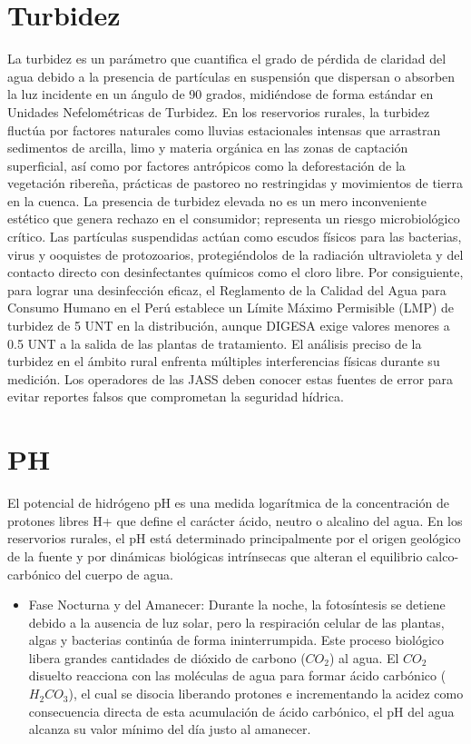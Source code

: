 \section{Turbidez}
La turbidez es un parámetro  que cuantifica el grado de pérdida de claridad del agua debido a la presencia de partículas en suspensión que dispersan o absorben la luz incidente en un ángulo de 90 grados, midiéndose de forma estándar en Unidades Nefelométricas de Turbidez. En los reservorios rurales, la turbidez fluctúa por factores naturales como lluvias estacionales intensas que arrastran sedimentos de arcilla, limo y materia orgánica en las zonas de captación superficial, así como por factores antrópicos como la deforestación de la vegetación ribereña, prácticas de pastoreo no restringidas y movimientos de tierra en la cuenca.
La presencia de turbidez elevada no es un mero inconveniente estético que genera rechazo en el consumidor; representa un riesgo microbiológico crítico. Las partículas suspendidas actúan como escudos físicos para las bacterias, virus y ooquistes de protozoarios, protegiéndolos de la radiación ultravioleta y del contacto directo con desinfectantes químicos como el cloro libre. Por consiguiente, para lograr una desinfección eficaz, el Reglamento de la Calidad del Agua para Consumo Humano en el Perú establece un Límite Máximo Permisible (LMP) de turbidez de 5 UNT en la distribución, aunque DIGESA exige valores menores a 0.5 UNT a la salida de las plantas de tratamiento.
El análisis preciso de la turbidez en el ámbito rural enfrenta múltiples interferencias físicas durante su medición. Los operadores de las JASS deben conocer estas fuentes de error para evitar reportes falsos que comprometan la seguridad hídrica.

\section{PH}
El potencial de hidrógeno pH es una medida logarítmica de la concentración de protones libres H+ que define el carácter ácido, neutro o alcalino del agua. En los reservorios rurales, el pH está determinado principalmente por el origen geológico de la fuente y por dinámicas biológicas intrínsecas que alteran el equilibrio calco-carbónico del cuerpo de agua.

\begin{itemize}
	\item Fase Nocturna y del Amanecer: Durante la noche, la fotosíntesis se detiene debido a la ausencia de luz solar, pero la respiración celular de las plantas, algas y bacterias continúa de forma ininterrumpida. Este proceso biológico libera grandes cantidades de dióxido de carbono ($CO_2$) al agua. El $CO_2$  disuelto reacciona con las moléculas de agua para formar ácido carbónico ($H_2CO_3$), el cual se disocia liberando protones e incrementando la acidez como consecuencia directa de esta acumulación de ácido carbónico, el pH del agua alcanza su valor mínimo del día justo al amanecer.
\end{itemize}
    
